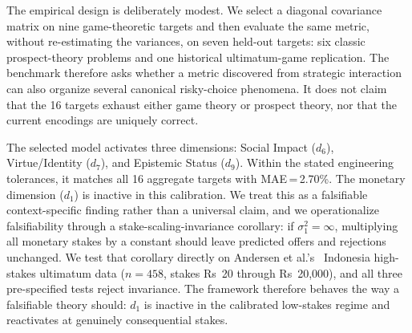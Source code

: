 \documentclass[journal]{IEEEtran}
\begin{document}
The empirical design is deliberately modest.
We select a diagonal covariance matrix on nine game-theoretic targets and then evaluate the same metric, without re-estimating the variances, on seven held-out targets: six classic prospect-theory problems and one historical ultimatum-game replication.
The benchmark therefore asks whether a metric discovered from strategic interaction can also organize several canonical risky-choice phenomena.
It does not claim that the 16 targets exhaust either game theory or prospect theory, nor that the current encodings are uniquely correct.

The selected model activates three dimensions: Social Impact ($d_6$), Virtue/Identity ($d_7$), and Epistemic Status ($d_9$).
Within the stated engineering tolerances, it matches all 16 aggregate targets with MAE\,=\,2.70\%.
The monetary dimension ($d_1$) is inactive in this calibration.
We treat this as a falsifiable context-specific finding rather than a universal claim, and we operationalize falsifiability through a stake-scaling-invariance corollary: if $\sigma_1^2=\infty$, multiplying all monetary stakes by a constant should leave predicted offers and rejections unchanged.
We test that corollary directly on Andersen et al.'s~\cite{andersen2011} Indonesia high-stakes ultimatum data ($n{=}458$, stakes Rs~20 through Rs~20{,}000), and all three pre-specified tests reject invariance.
The framework therefore behaves the way a falsifiable theory should: $d_1$ is inactive in the calibrated low-stakes regime and reactivates at genuinely consequential stakes.
\end{document}
